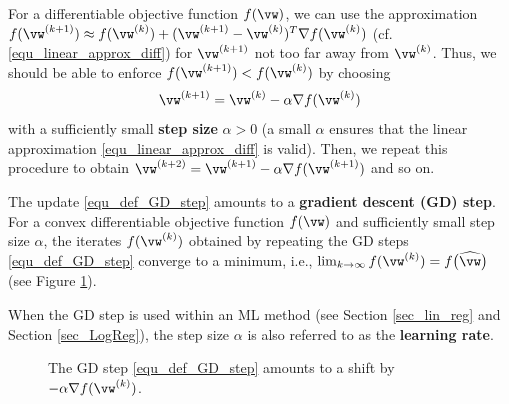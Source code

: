 \documentclass[12pt]{report}
\begin{document}
For a differentiable objective function $f(\vw)$, we can use the 
approximation $f(\vw^{(k+1)})  \approx f(\vw^{(k)}) + (\vw^{(k+1)} - \vw^{(k)})^{T} \nabla f(\vw^{(k)})$ (cf. \eqref{equ_linear_approx_diff}) for $\vw^{(k+1)}$ not too far away from $\vw^{(k)}$. %
Thus, we should be able to enforce $f(\vw^{(k+1)}) < f(\vw^{(k)})$ 
by choosing 
\begin{equation} 
\label{equ_def_GD_step}
\vw^{(k+1)} = \vw^{(k)} - \alpha \nabla f(\vw^{(k)})
\end{equation} 
with a sufficiently small {\bf step size} $\alpha>0$ (a small $\alpha$ 
ensures that the linear approximation \eqref{equ_linear_approx_diff} is valid). 
Then, we repeat this procedure to obtain $\vw^{(k+2)} = \vw^{(k+1)} - \alpha \nabla f(\vw^{(k+1)})$ and so on. 

The update \eqref{equ_def_GD_step} amounts to a {\bf gradient descent (GD) step}. 
For a convex differentiable objective function $f(\vw)$ 
and sufficiently small step size $\alpha$, the iterates $f(\vw^{(k)})$ 
obtained by repeating the GD steps \eqref{equ_def_GD_step} converge 
to a minimum, i.e., $\lim_{k \rightarrow \infty} f(\vw^{(k)}) = f\big(\widehat{\vw}\big)$ (see Figure \ref{fig_basic_GD_step}). 

When the GD step is used within an ML method (see Section \ref{sec_lin_reg} 
and Section \ref{sec_LogReg}), the step size $\alpha$ is also referred to 
as the {\bf learning rate}. 
\begin{figure}
\begin{center}
\end{center}
\caption{The GD step \eqref{equ_def_GD_step} amounts to a shift by $-\alpha \nabla f(\vw^{(k)})$.}
\label{fig_basic_GD_step}
\end{figure}
\end{document}
